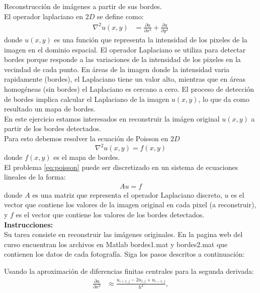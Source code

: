 \begin{homeworkProblem}
  Reconstrucción de imágenes a partir de sus bordes.\\
  El operador laplaciano en $2D$ se define como:
  \begin{align*}
    \nabla^2 u(x,y)&=\frac{\partial u}{\partial x^2}+\frac{\partial u}{\partial y^2}
  \end{align*}
  donde $u(x,y)$ es una función que representa la intensidad de los pixeles de la imagen en el dominio espacial. El operador Laplaciano se utiliza para detectar bordes porque responde a las variaciones de la intensidad de los pixeles en la vecindad de cada punto. En áreas de la imagen donde la intensidad varia rapidamente (bordes), el Laplaciano tiene un valor alto, mientras que en áreas homogéneas (sin bordes) el Laplaciano es cercano a cero. El proceso de detección de bordes implica calcular el Laplaciano de la imagen $u(x,y)$, lo que da como resultado un mapa de bordes.\\
  En este ejercicio estamos interesados en reconstruir la imágen original $u(x,y)$ a partir de los bordes detectados.\\
  Para esto debemos resolver la ecuación de Poisson en $2D$
  \begin{equation}\label{eq:poisson}
    \nabla^2u(x,y)=f(x,y)
  \end{equation}
  donde $f(x,y)$ es el mapa de bordes.\\
  El problema \ref{eq:poisson} puede ser discretizado en un sistema de ecuaciones lineales de la forma:
  \begin{align*}
    Au=f
  \end{align*}
  donde $A$ es una matriz que representa el operador Laplaciano discreto, $u$ es el vector que contiene los valores de la imagen original en cada pixel (a reconstruir), y $f$ es el vector que contiene los valores de los bordes detectados.\\
  \textbf{Instrucciones:}\\
  Su tarea consiste en reconstruir las imágenes originales. En la pagina web del curso encuentran los archivos en Matlab bordes1.mat y bordes2.mat que contienen los datos de cada fotografía. Siga los pasos descritos a continuación:
  \begin{solucion}
    Usando la aproximación de diferencias finitas centrales para la segunda derivada:
    \begin{align*}
      \frac{\partial u}{\partial x^2}&\approx \frac{u_{i+1,j}-2u_{i,j}+u_{i-1,j}}{h^2},\\

\end{align*}
\end{solucion}
\end{homeworkProblem}
